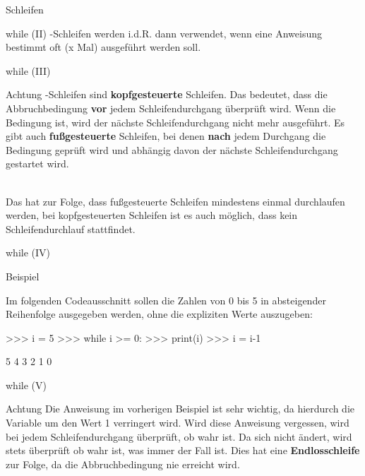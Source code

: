 \begin{subsection}{Schleifen}
\begin{frame}{while (II)}
            -Schleifen werden i.d.R. dann verwendet, wenn eine Anweisung bestimmt oft (x Mal) ausgeführt werden soll.
            
        \end{frame}
        
        \begin{frame}{while (III)}
            \begin{alertblock}{Achtung}
                -Schleifen sind \textbf{kopfgesteuerte} Schleifen. Das bedeutet, dass die Abbruchbedingung \textbf{vor} jedem Schleifendurchgang überprüft wird. Wenn die Bedingung  ist, wird der nächste Schleifendurchgang nicht mehr ausgeführt.
                Es gibt auch \textbf{fußgesteuerte} Schleifen, bei denen \textbf{nach} jedem Durchgang die Bedingung geprüft wird und abhängig davon der nächste Schleifendurchgang gestartet wird. \\~\
                
                Das hat zur Folge, dass fußgesteuerte Schleifen mindestens einmal durchlaufen werden, bei kopfgesteuerten Schleifen ist es auch möglich, dass kein Schleifendurchlauf stattfindet.
            \end{alertblock}
        \end{frame}
        
        \begin{frame}[fragile]{while (IV)}
                \begin{exampleblock}{Beispiel}
                
                Im folgenden Codeausschnitt sollen die Zahlen von 0 bis 5 in absteigender Reihenfolge ausgegeben werden, ohne die expliziten Werte auszugeben:
\begin{pyconcode}
>>> i = 5
>>> while i >= 0:
>>>     print(i)
>>>     i = i-1

5
4
3
2
1
0
\end{pyconcode}                
                \end{exampleblock}
        \end{frame}
        
        \begin{frame}[fragile]{while (V)}
            \begin{alertblock}{Achtung}
                Die Anweisung  im vorherigen Beispiel ist sehr wichtig, da hierdurch die Variable  um den Wert 1 verringert wird. Wird diese Anweisung vergessen, wird bei jedem Schleifendurchgang überprüft, ob  wahr ist. Da sich  nicht ändert, wird stets überprüft ob  wahr ist, was immer der Fall ist. Dies hat eine \textbf{Endlosschleife} zur Folge, da die Abbruchbedingung nie erreicht wird.
            \end{alertblock}
        \end{frame}
        

\end{subsection}
